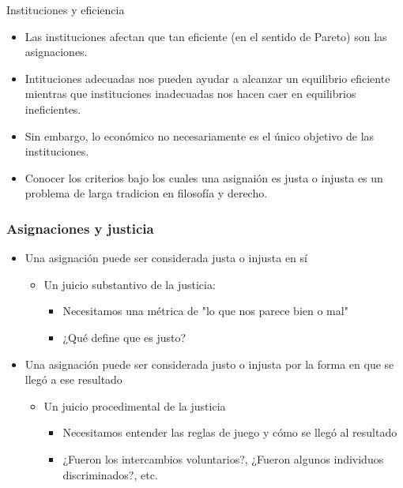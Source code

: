\documentclass{beamer}
\begin{document}
\begin{frame}{Instituciones y eficiencia}
    \begin{itemize}
        \item Las instituciones afectan que tan eficiente (en el sentido de Pareto) son las asignaciones.
        \item Intituciones adecuadas nos pueden ayudar a alcanzar un equilibrio eficiente mientras que instituciones inadecuadas nos hacen caer en equilibrios ineficientes.
        \item Sin embargo, lo económico no necesariamente es el único objetivo de las instituciones.
        \item Conocer los criterios bajo los cuales una asignaión es justa o injusta es un problema de larga tradicion en filosofía y derecho.
    \end{itemize}
\end{frame}

\begin{frame}
\frametitle{Asignaciones y justicia}
\begin{itemize}
    \item Una asignación puede ser considerada justa o injusta en sí
    \begin{itemize}
        \item Un juicio substantivo de la justicia:
        \begin{itemize}
            \item Necesitamos una métrica de "lo que nos parece bien o mal"
            \item ¿Qué define que es justo?
        \end{itemize}
    \end{itemize}
    \item  Una asignación puede ser considerada justo o  injusta por la forma en que se llegó a ese resultado\vspace{2mm}
    \begin{itemize}
        \item Un juicio procedimental de la justicia
        \begin{itemize} 
            \item Necesitamos entender las reglas de juego y cómo se llegó al resultado \\
            \item ¿Fueron los intercambios voluntarios?, ¿Fueron algunos individuos discriminados?, etc.
        \end{itemize}
    \end{itemize}
\end{itemize}
\end{frame}
\end{document}
